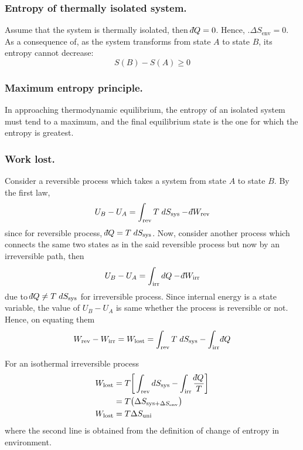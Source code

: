\documentclass[../../../Main.tex]{subfiles}
\begin{document}
\subsubsection*{Entropy of thermally isolated system.} Assume that the system is thermally isolated, then $\dbar Q = 0$. Hence, $.\Delta S_{\text{env}}=0$. As a consequence of, as the system transforms from state $A$ to state $B$, its entropy cannot decrease:
\begin{equation*}
    S(B)-S(A)\geq0
\end{equation*}

\subsubsection*{Maximum entropy principle.} In approaching thermodynamic equilibrium, the entropy of an isolated system must tend to a maximum, and the final equilibrium state is the one for which the entropy is greatest.

\subsubsection*{Work lost.} Consider a reversible process which takes a system from state $A$ to state $B$. By the first law, 
\begin{equation*}
    U_B-U_A=\int_{\text{rev}}T\;dS_{\text{sys}}-\dbar W_{\text{rev}}
\end{equation*}
since for reversible process, $\dbar Q=T\;dS_{\text{sys}}$. Now, consider another process which connects the same two states as in the said reversible process but now by an irreversible path, then
\begin{equation*}
    U_B-U_A=\int_{\text{irr}}dQ-\dbar W_{\text{irr}}
\end{equation*}
due to $\dbar Q\neq T\;dS_{\text{sys}}$ for irreversible process. Since internal energy is a state variable, the value of $U_B - U_A$ is same whether the process is reversible or not. Hence, on equating them 
\begin{equation*}
    W_{\text{rev}}-W_{\text{irr}}=W_{\text{lost}}= \int_{\text{rev}}T\;dS_{\text{sys}}-\int_{\text{irr}}\dbar Q
\end{equation*}

For an isothermal irreversible process
\begin{align*}
    W_{\text{lost}}&=T\bigg[ \int_{\text{rev}}dS_{\text{sys}}-\int_{\text{irr}}\frac{\dbar Q}{T} \bigg]\\
    &=T\big(\Delta S_{\text{sys}+\Delta S_{\text{env}}}\big)\\
    W_{\text{lost}}&=T\Delta S_\text{uni}
\end{align*}
where the second line is obtained from the definition of change of entropy in environment.
\end{document}
